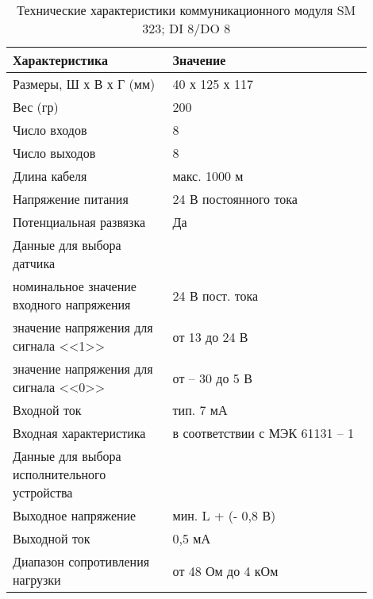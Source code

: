\begin{table}[h!]
\caption{Технические характеристики коммуникационного модуля SM 323; DI 8/DO 8}
\label{5.tabl:tSM323}
 
\begin{center}
\begin{tabular}{|p{0.4\linewidth}|p{0.5\linewidth}|}
\hline
Характеристика                               & Значение              \\
\hline
Размеры, Ш х В х Г (мм)                      & 40 х 125 х 117        \\
\hline 
Вес (гр)                                     & 200                   \\
\hline
Число входов                                 & 8                     \\
\hline
Число выходов                                & 8                     \\
\hline
Длина кабеля                                 & макс. 1000 м          \\
\hline
Напряжение питания                           & 24 В постоянного тока \\
\hline
Потенциальная развязка                       & Да                    \\
\hline
Данные для выбора датчика                    &                       \\
\hline
номинальное значение входного напряжения     & 24 В пост. тока       \\
\hline
значение напряжения для сигнала <<1>>        & от 13 до 24 В         \\ 
\hline
значение напряжения для сигнала <<0>>        & от – 30 до 5 В        \\
\hline
Входной ток                                  & тип. 7 мА             \\
\hline
Входная характеристика                       & в соответствии с МЭК 61131 -- 1 \\
\hline
Данные для выбора исполнительного устройства &                       \\
\hline
Выходное напряжение                          & мин. L + (- 0,8 В)    \\
\hline
Выходной ток                                 & 0,5 мА                \\
\hline
Диапазон сопротивления нагрузки              & от 48 Ом до 4 кОм     \\
\hline
 
\end{tabular}
\end{center}
\end{table}


